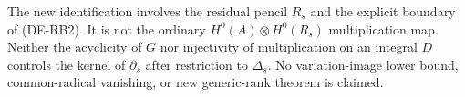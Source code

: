 \begin{remark}
\label{rem:DE-A3-residual-pencil-boundary-scope-candidate}
The new identification involves the residual pencil $R_s$ and
the explicit boundary of (DE-RB2). It is not the ordinary
$H^0(A)\otimes H^0(R_s)$ multiplication map. Neither the
acyclicity of $G$ nor injectivity of multiplication on an
integral $D$ controls the kernel of $\partial_s$ after
restriction to $\Delta_s$. No variation-image lower bound,
common-radical vanishing, or new generic-rank theorem is claimed.
\end{remark}
